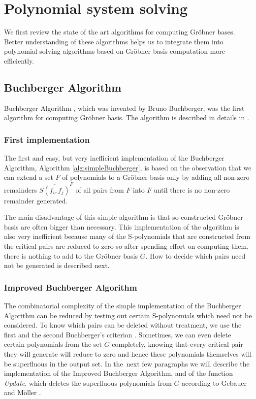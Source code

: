 \chapter{Polynomial system solving}
\label{chapter:polynomialSolving}
We first review the state of the art algorithms for computing Gr\"obner bases. Better understanding of these algorithms helps us to integrate them into polynomial solving algorithms based on Gr\"obner basis computation more efficiently.

\section{Buchberger Algorithm}
Buchberger Algorithm \cite{Buchberger65}, which was invented by Bruno Buchberger, was the first algorithm for computing Gr\"obner basis. The algorithm is described in details in \cite{Becker93, Cox-Little-Shea97}.

\subsection{First implementation}
The first and easy, but very inefficient implementation of the Buchberger Algorithm, Algorithm \ref{alg:simpleBuchberger}, is based on the observation that we can extend a set $F$ of polynomials to a Gr\"obner basis only by adding all non-zero remainders $\overline{S(f_i, f_j)}^F$ of all pairs from $F$ into $F$ until there is no non-zero remainder generated.

The main disadvantage of this simple algorithm is that so constructed Gr\"obner basis are often bigger than necessary. This implementation of the algorithm is also very inefficient because many of the S-polynomials that are constructed from the critical pairs are reduced to zero so after spending effort on computing them, there is nothing to add to the Gr\"obner basis $G$. How to decide which pairs need not be generated is described next.



\subsection{Improved Buchberger Algorithm}
\label{subsec:ImprovedBuchberger}
The combinatorial complexity of the simple implementation of the Buchberger Algorithm can be reduced by testing out certain S-polynomials which need not be considered. To know which pairs can be deleted without treatment, we use the first and the second Buchberger's criterion \cite{Becker93}. Sometimes, we can even delete certain polynomials from the set $G$ completely, knowing that every critical pair they will generate will reduce to zero and hence these polynomials themselves will be superfluous in the output set. In the~next few paragraphs we will describe the implementation of the Improved Buchberger Algorithm, and of the function \textit{Update}, which deletes the superfluous polynomials from $G$ according to Gebauer and M\"oller \cite{Gebauer-Moller88}.

